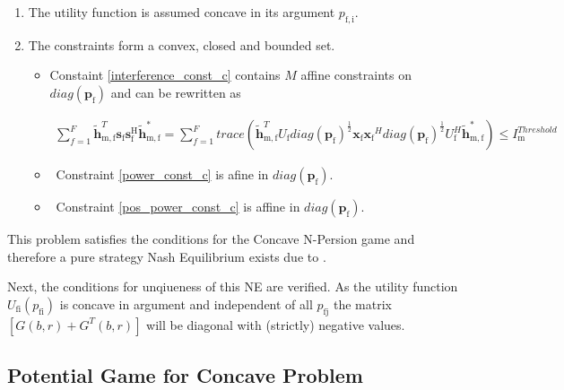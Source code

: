 \documentclass[12pt,a4paper]{report}
\begin{document}
\begin{enumerate}
\item The utility function is assumed concave in its argument $p_{\mathrm{f,i}}$.

\item
The constraints form a convex, closed and bounded set. 

\begin{itemize}

\item
	Constaint \eqref{interference_const_c} contains $M$ affine constraints on $diag(\mathbf{p_{\mathrm{f}}})$ and 
	can be rewritten as 

\begin{gather*}
	  \sum^F_{f=1} \mathbf{\tilde{h}}_{\mathrm{m,f}}^T  \mathbf{s}_{\mathrm{f}} 						
	\mathbf{s_{\mathrm{f}}^{\mathrm{H}}} \mathbf{\tilde{h}_{\mathrm{m,f}}^*} = 
	\sum^F_{f=1} trace(\mathbf{\tilde{h}}_{\mathrm{m,f}}^T U_{\mathrm{f}}diag(\mathbf{p_{\mathrm{f}}})^{\frac{1}{2}}\mathbf{x_{\mathrm{f}}}
	 \mathbf{x_{\mathrm{f}}}^H  diag(\mathbf{p_{\mathrm{f}}})^{\frac{1}{2}} U_{\mathrm{f}}^H
	 \mathbf{\tilde{h}}_{\mathrm{m,f}}^*
	)	
	\leq I^{Threshold}_{\mathrm{m}} 
\end{gather*}

\item \
	Constraint \eqref{power_const_c} is  afine in $diag(\mathbf{p_{\mathrm{f}}})$.
	
\item \
	Constraint \eqref{pos_power_const_c} is affine in $diag(\mathbf{p_{\mathrm{f}}})$.
\end{itemize}


\end{enumerate}

This problem satisfies the conditions for the Concave N-Persion game and therefore a pure strategy Nash Equilibrium exists due to 
\cite[Thm1]{rosen1964existence}.

Next, the conditions for unqiueness of this NE are verified. As the utility function $U_{\mathrm{fi}}(p_{\mathrm{fi}})$ is concave in argument and independent of all $p_{\mathrm{fj}}$ the matrix $[G(b,r)+G^{T}(b,r)] $ will be diagonal with (strictly) negative values.
\subsection{Potential Game for Concave Problem}
\end{document}
